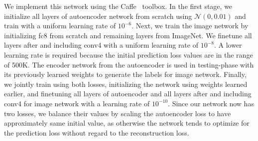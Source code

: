 \documentclass[runningheads]{llncs}
\begin{document}
We implement this network using the Caffe~\cite{Jia2014caffe} toolbox. In the first stage,
we initialize all layers of autoencoder
network from scratch using $\mathcal{N}(0,0.01)$ and train with a uniform learning rate of $10^{-6}$.
Next, we train the image network by initializing fc8 from scratch and remaining layers from
ImageNet. We finetune all layers after and including conv4 with a uniform learning rate of $10^{-8}$. 
A lower learning rate is required because the initial prediction loss values are in the range of 500K.
The encoder network from the autoencoder is used in testing-phase with its previously learned weights
to generate the labels for image network.
Finally, we jointly train using both losses, initializing the network using weights learned earlier,
and finetuning all layers of autoencoder and all layers after and including conv4 for image network
with a learning rate of $10^{-10}$. 
Since our network now has two losses, we balance their values
by scaling the autoencoder loss to have approximately same initial value, 
as otherwise the network tends to optimize for 
the prediction loss without regard to the reconstruction loss.
\end{document}
